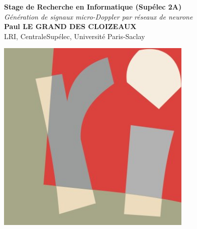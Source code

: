 \documentclass[a0,portrait]{a0poster}
\begin{document}
\large
\sffamily 


\begin{minipage}[b]{0.75\linewidth}
\veryHuge \color{NavyBlue} \textbf{Stage de Recherche en Informatique (Sup\'e{}lec 2A)} \color{Black}\\
\Huge\textit{ Génération de signaux micro-Doppler par réseaux de neurone }\\[18mm]
\huge \textbf{Paul LE GRAND DES CLOIZEAUX}\\[0.5cm] 
\huge LRI, CentraleSupélec, Université Paris-Saclay
\end{minipage}
%
\begin{minipage}[b]{0.23\linewidth}
\begin{flushright}
\includegraphics[width=0.7\textwidth]{logo_lri.jpg}
\end{flushright}
\end{minipage}

\vspace{1cm} %

\end{document}

